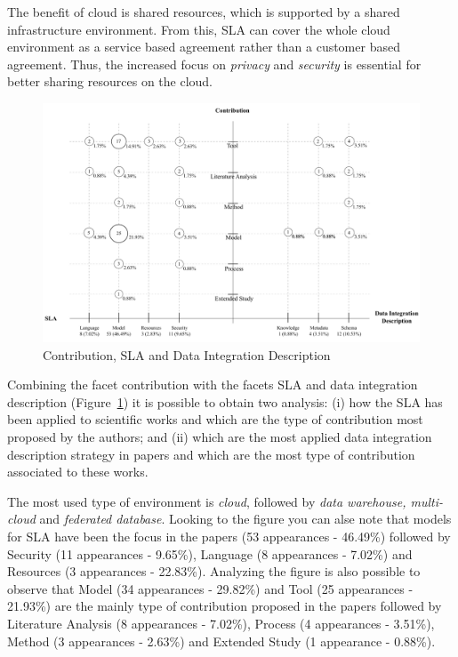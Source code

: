 The benefit of cloud is shared resources, which is supported by a shared
infrastructure environment. From this, SLA can cover the whole cloud environment
as a service based agreement rather than a customer based agreement. Thus, the
increased focus on \textit{privacy} and \textit{security} is essential for
better sharing resources on the cloud.


\begin{figure}[h!]
\centering
\includegraphics[scale=0.56]{figs/bubble-charts/Contribution-SLA-DIdescription.pdf} 
\caption{Contribution, SLA and Data Integration Description}\label{fig:facet1}
\end{figure}

Combining the facet contribution with the facets SLA and data integration description 
(Figure~\ref{fig:facet1}) it is possible to obtain two analysis: 
(i) how the SLA has been applied to scientific works and which are the type of contribution 
most proposed by the authors; and (ii) which are the most applied data integration description
strategy in papers and which are the most type of contribution associated to these works. 

The most used type of environment is \textit{cloud}, followed by \textit{data
warehouse, multi-cloud} and \textit{federated database}. Looking to the figure
you can alse note that models for SLA have been the focus in the papers (53 appearances - 46.49\%) followed by Security (11 appearances - 9.65\%), Language 
(8 appearances - 7.02\%) and Resources (3 appearances - 22.83\%).
Analyzing the figure is also possible to observe that Model (34 appearances - 29.82\%) and 
Tool (25 appearances - 21.93\%) are the mainly type of contribution proposed in the papers 
followed by Literature Analysis (8 appearances - 7.02\%), Process (4 appearances - 3.51\%), 
Method (3 appearances - 2.63\%) and Extended Study (1 appearance - 0.88\%).

